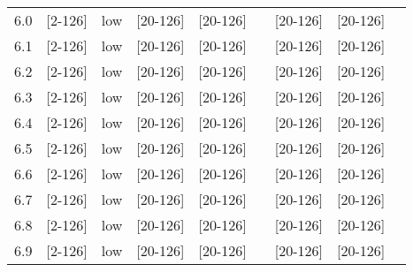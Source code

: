 \documentclass{article}
\begin{document}
\begin{tabular}{| l | l | l | l | l | l | l | l | l |}
      6.0 & [2-126] & low & [20-126] & [20-126] &  & [20-126] & [20-126] &\\
      6.1 & [2-126] & low & [20-126] & [20-126] &  & [20-126] & [20-126] &\\
      6.2 & [2-126] & low & [20-126] & [20-126] &  & [20-126] & [20-126] &\\
      6.3 & [2-126] & low & [20-126] & [20-126] &  & [20-126] & [20-126] &\\
      6.4 & [2-126] & low & [20-126] & [20-126] &  & [20-126] & [20-126] &\\
      6.5 & [2-126] & low & [20-126] & [20-126] &  & [20-126] & [20-126] &\\
      6.6 & [2-126] & low & [20-126] & [20-126] &  & [20-126] & [20-126] &\\
      6.7 & [2-126] & low & [20-126] & [20-126] &  & [20-126] & [20-126] &\\
      6.8 & [2-126] & low & [20-126] & [20-126] &  & [20-126] & [20-126] &\\
      6.9 & [2-126] & low & [20-126] & [20-126] &  & [20-126] & [20-126] &\\
      \hline
    \end{tabular}
\end{document}
